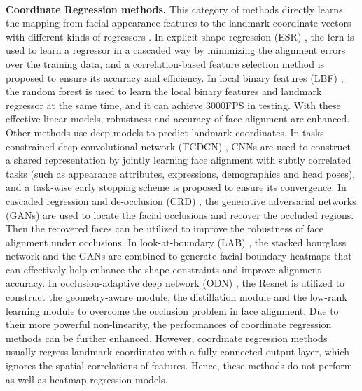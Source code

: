 \documentclass[journal]{IEEEtran}
\begin{document}
\\\indent\textbf{Coordinate Regression methods.} This category of methods directly learns the mapping from facial appearance features to the landmark coordinate vectors with different kinds of regressors \cite{cao2014face, ren2014face, zhang2014facial, Wu2018LookAB, Zhu2019RobustFL}. In explicit shape regression (ESR) \cite{cao2014face}, the fern is used to learn a regressor in a cascaded way by minimizing the alignment errors over the training data, and a correlation-based feature selection method is proposed to ensure its accuracy and efficiency. In local binary features (LBF) \cite{ren2014face}, the random forest is used to learn the local binary features and landmark regressor at the same time, and it can achieve 3000FPS in testing. With these effective linear models, robustness and accuracy of face alignment are enhanced. Other methods \cite{zhang2014facial, Wu2018LookAB, Zhu2019RobustFL} use deep models to predict landmark coordinates. In tasks-constrained deep convolutional network (TCDCN) \cite{zhang2014facial}, CNNs are used to construct a shared representation by jointly learning face alignment with subtly correlated tasks (such as appearance attributes, expressions, demographics and head poses), and a task-wise early stopping scheme is proposed to ensure its convergence. In cascaded regression and de-occlusion (CRD) \cite{wan2020robust}, the generative adversarial networks (GANs) are used to locate the facial occlusions and recover the occluded regions. Then the recovered faces can be utilized to improve the robustness of face alignment under occlusions. In look-at-boundary (LAB) \cite{ Wu2018LookAB}, the stacked hourglass network and the GANs are combined to generate facial boundary heatmaps that can effectively help enhance the shape constraints and improve alignment accuracy. In occlusion-adaptive deep network (ODN) \cite{Zhu2019RobustFL}, the Resnet is utilized to construct the geometry-aware module, the distillation module and the low-rank learning module to overcome the occlusion problem in face alignment. Due to their more powerful non-linearity, the performances of coordinate regression methods can be further enhanced. However, coordinate regression methods usually regress landmark coordinates with a fully connected output layer, which ignores the spatial correlations of features. Hence, these methods do not perform as well as heatmap regression models.
\end{document}
